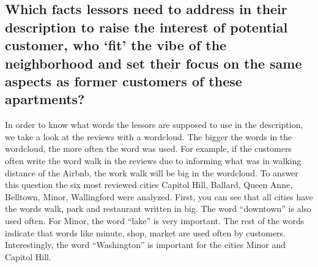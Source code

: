 \documentclass[journal]{IEEEtran}
\begin{document}
\subsection{Which facts lessors need to address in their description to raise the interest of potential customer, who ‘fit’ the vibe of the neighborhood and set their focus on the same aspects as former customers of these apartments?}
In order to know what words the lessors are supposed to use in the description, we take a look at the reviews with a wordcloud. The bigger the words in the wordcloud, the more often the word was used. For example, if the customers often write the word walk in the reviews due to informing what was in walking distance of the Airbnb, the work walk will be big in the wordcloud. 
To answer this question the six most reviewed cities Capitol Hill, Ballard, Queen Anne, Belltown, Minor, Wallingford were analyzed. First, you can see that all cities have the words walk, park and restaurant written in big. The word “downtown” is also used often. For Minor, the word “lake” is very important. The rest of the words indicate that words like minute, shop, market are used often by customers. Interestingly, the word “Washington” is important for the cities Minor and Capitol Hill.
\end{document}
